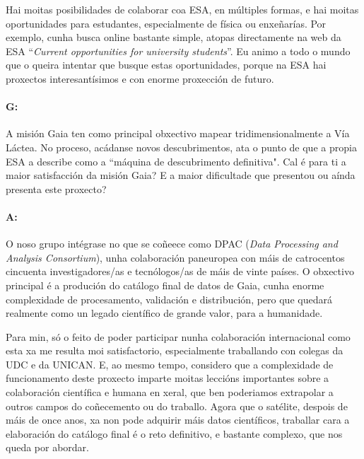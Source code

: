 \begin{refsection}
\begin{multicols}{2}
Hai moitas posibilidades de colaborar coa ESA, en múltiples formas, e hai
moitas oportunidades para estudantes, especialmente de física ou enxeñarías.
Por exemplo, cunha busca online bastante simple, atopas directamente na web da
ESA  “\textit{Current opportunities for university students}”. Eu animo a todo
o mundo que o queira intentar que busque estas oportunidades, porque na ESA hai
proxectos interesantísimos e con enorme proxección de futuro.

\paragraph{G:} A misión Gaia ten como principal obxectivo mapear
tridimensionalmente a Vía Láctea. No proceso, acádanse novos descubrimentos,
ata o punto de que a propia ESA a describe como a ``máquina de descubrimento
definitiva". Cal é para ti a maior satisfacción da misión Gaia? E a maior
dificultade que presentou ou aínda presenta este proxecto?

\paragraph{A:} O noso grupo intégrase no que se coñeece como DPAC (\textit{Data
Processing and Analysis Consortium}), unha colaboración paneuropea con máis de
catrocentos cincuenta investigadores/as e tecnólogos/as de máis de vinte
países. O obxectivo principal é a produción do catálogo final de datos de Gaia,
cunha enorme complexidade de procesamento, validación e distribución, pero que
quedará realmente como un legado científico de grande valor, para a humanidade.

Para min, só o feito de poder participar nunha colaboración internacional como
esta xa me resulta moi satisfactorio, especialmente traballando con colegas da
UDC e da UNICAN. E, ao mesmo tempo, considero que a complexidade de
funcionamento deste proxecto imparte moitas leccións importantes sobre a
colaboración científica e humana en xeral, que ben poderiamos extrapolar a
outros campos do coñecemento ou do traballo. Agora que o satélite, despois de
máis de once anos, xa non pode adquirir máis datos científicos, traballar cara
a elaboración do catálogo final é o reto definitivo, e bastante complexo, que
nos queda por abordar.


\end{multicols}
\end{refsection}
